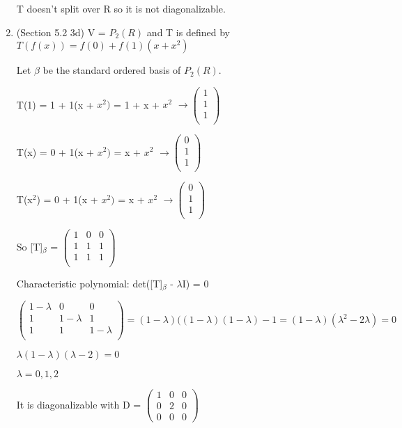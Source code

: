 \documentclass[12pt]{article}
\begin{document}
\begin{enumerate}
    T doesn't split over R so it is not diagonalizable. 

    \item (Section 5.2 3d)
    V = $P_2(R)$ and T is defined by $T(f(x)) = f(0) + f(1)(x + x^2)$

    Let $\beta$ be the standard ordered basis of $P_2(R)$. 
    
    T(1) = 1 + 1(x + $x^2)$ = 1 + x + $x^2$ $\rightarrow \begin{pmatrix}
        1 \\ 
        1 \\
        1\\
    \end{pmatrix}$

    T(x) = 0 + 1(x + $x^2)$ = x + $x^2$ $\rightarrow \begin{pmatrix}
        0 \\ 
        1 \\
        1\\
    \end{pmatrix}$

    T(x$^2$) = 0 + 1(x + $x^2)$ = x + $x^2$ $\rightarrow \begin{pmatrix}
        0 \\ 
        1 \\
        1\\
    \end{pmatrix}$

    So [T]$_\beta$ = $\begin{pmatrix}
        1 & 0 & 0 \\
        1 & 1 & 1 \\
        1 & 1 & 1 \\
    \end{pmatrix}$
    
    Characteristic polynomial: det([T]$_\beta$ - $\lambda$I) = 0
    
    $\begin{pmatrix}
        1 -\lambda & 0 & 0 \\
        1 & 1 - \lambda & 1 \\
        1 & 1 & 1 - \lambda \\
    \end{pmatrix} = (1 -\lambda)((1-\lambda)(1-\lambda) - 1 = (1 - \lambda)(\lambda^2 - 2\lambda) = 0$

    $\lambda(1 - \lambda)(\lambda - 2) = 0$

    $\lambda = 0, 1, 2$

    It is diagonalizable with D = $\begin{pmatrix}
        1 & 0 & 0 \\
        0 & 2 & 0 \\
        0 & 0 & 0
    \end{pmatrix}$


\end{enumerate}
\end{document}
